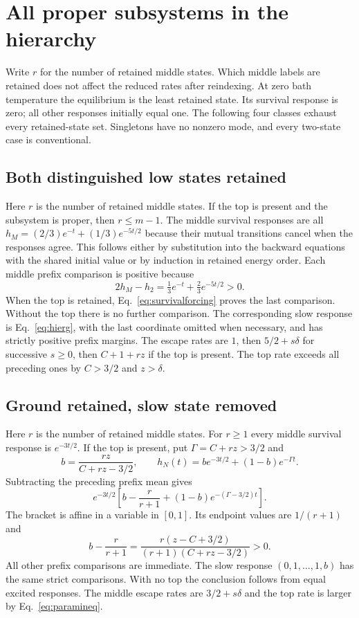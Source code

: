 \documentclass[11pt,a4paper]{article}
\theoremstyle{remark}\newtheorem{remark}[theorem]{Remark}
\begin{document}
\section{All proper subsystems in the hierarchy}\label{app:proper}
Write $r$ for the number of retained middle states. Which middle labels are retained does not affect the reduced rates after reindexing. At zero bath temperature the equilibrium is the least retained state. Its survival response is zero; all other responses initially equal one. The following four classes exhaust every retained-state set. Singletons have no nonzero mode, and every two-state case is conventional.

\subsection{Both distinguished low states retained}
Here $r$ is the number of retained middle states. If the top is present and the subsystem is proper, then $r\le m-1$. The middle survival responses are all $h_M=(2/3)e^{-t}+(1/3)e^{-5t/2}$ because their mutual transitions cancel when the responses agree. This follows either by substitution into the backward equations with the shared initial value or by induction in retained energy order. Each middle prefix comparison is positive because
\begin{equation}
 2h_M-h_2=\tfrac13e^{-t}+\tfrac23e^{-5t/2}>0.
\end{equation}
When the top is retained, Eq.~\eqref{eq:survivalforcing} proves the last comparison. Without the top there is no further comparison. The corresponding slow response is Eq.~\eqref{eq:hierg}, with the last coordinate omitted when necessary, and has strictly positive prefix margins. The escape rates are $1$, then $5/2+s\delta$ for successive $s\ge0$, then $C+1+rz$ if the top is present. The top rate exceeds all preceding ones by $C>3/2$ and $z>\delta$.

\subsection{Ground retained, slow state removed}
Here $r$ is the number of retained middle states. For $r\ge1$ every middle survival response is $e^{-3t/2}$. If the top is present, put $\Gamma=C+rz>3/2$ and
\begin{equation}
 b=\frac{rz}{C+rz-3/2},\qquad
 h_N(t)=be^{-3t/2}+(1-b)e^{-\Gamma t}.
\end{equation}
Subtracting the preceding prefix mean gives
\begin{equation}
 e^{-3t/2}\left[b-\frac{r}{r+1}+(1-b)e^{-(\Gamma-3/2)t}\right].
\end{equation}
The bracket is affine in a variable in $[0,1]$. Its endpoint values are $1/(r+1)$ and
\begin{equation}
 b-\frac{r}{r+1}
 =\frac{r(z-C+3/2)}{(r+1)(C+rz-3/2)}>0.
\end{equation}
All other prefix comparisons are immediate. The slow response $(0,1,\ldots,1,b)$ has the same strict comparisons. With no top the conclusion follows from equal excited responses. The middle escape rates are $3/2+s\delta$ and the top rate is larger by Eq.~\eqref{eq:paramineq}.
\end{document}
